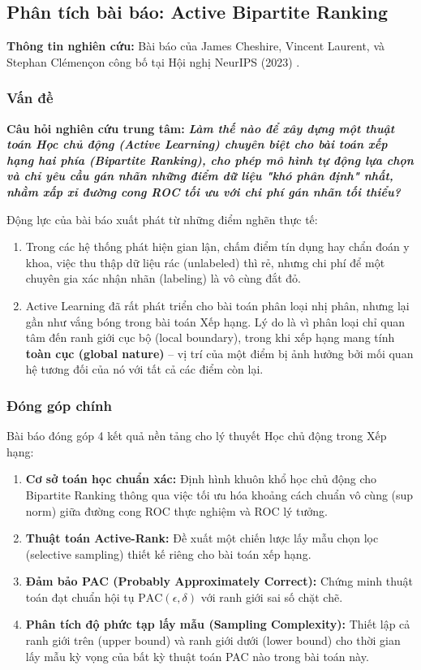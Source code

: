 \subsection{Phân tích bài báo: Active Bipartite Ranking}
\textbf{Thông tin nghiên cứu:} Bài báo của James Cheshire, Vincent Laurent, và Stephan Clémençon công bố tại Hội nghị NeurIPS (2023) \citep{cheshire2023active}.

\subsubsection{Vấn đề}


\begin{tcolorbox}\textbf{Câu hỏi nghiên cứu trung tâm:}\bfseries
  \textit{Làm thế nào để xây dựng một thuật toán Học chủ động (Active Learning) chuyên biệt cho bài toán xếp hạng hai phía (Bipartite Ranking), cho phép mô hình tự động lựa chọn và chỉ yêu cầu gán nhãn những điểm dữ liệu "khó phân định" nhất, nhằm xấp xỉ đường cong ROC tối ưu với chi phí gán nhãn tối thiểu?}
\end{tcolorbox}
\medskip

Động lực của bài báo xuất phát từ những điểm nghẽn thực tế:
\begin{enumerate}
  \item Trong các hệ thống phát hiện gian lận, chấm điểm tín dụng hay chẩn đoán y khoa, việc thu thập dữ liệu rác (unlabeled) thì rẻ, nhưng chi phí để một chuyên gia xác nhận nhãn (labeling) là vô cùng đắt đỏ.
  \item Active Learning đã rất phát triển cho bài toán phân loại nhị phân, nhưng lại gần như vắng bóng trong bài toán Xếp hạng. Lý do là vì phân loại chỉ quan tâm đến ranh giới cục bộ (local boundary), trong khi xếp hạng mang tính \textbf{toàn cục (global nature)} -- vị trí của một điểm bị ảnh hưởng bởi mối quan hệ tương đối của nó với tất cả các điểm còn lại.
\end{enumerate}

\subsubsection{Đóng góp chính}
Bài báo đóng góp 4 kết quả nền tảng cho lý thuyết Học chủ động trong Xếp hạng:
\begin{enumerate}
  \item \textbf{Cơ sở toán học chuẩn xác:} Định hình khuôn khổ học chủ động cho Bipartite Ranking thông qua việc tối ưu hóa khoảng cách chuẩn vô cùng (sup norm) giữa đường cong ROC thực nghiệm và ROC lý tưởng.
  \item \textbf{Thuật toán Active-Rank:} Đề xuất một chiến lược lấy mẫu chọn lọc (selective sampling) thiết kế riêng cho bài toán xếp hạng.
  \item \textbf{Đảm bảo PAC (Probably Approximately Correct):} Chứng minh thuật toán đạt chuẩn hội tụ $\text{PAC}(\epsilon, \delta)$ với ranh giới sai số chặt chẽ.
  \item \textbf{Phân tích độ phức tạp lấy mẫu (Sampling Complexity):} Thiết lập cả ranh giới trên (upper bound) và ranh giới dưới (lower bound) cho thời gian lấy mẫu kỳ vọng của bất kỳ thuật toán PAC nào trong bài toán này.
\end{enumerate}

